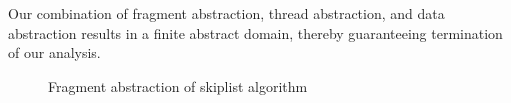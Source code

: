 Our combination of fragment abstraction, thread abstraction, and data
abstraction results in a finite abstract domain, thereby guaranteeing
termination of our analysis.


\begin{figure}
\center
	
\caption{Fragment abstraction of skiplist algorithm}
\label{fig:skiplistabs}
\end{figure} 


